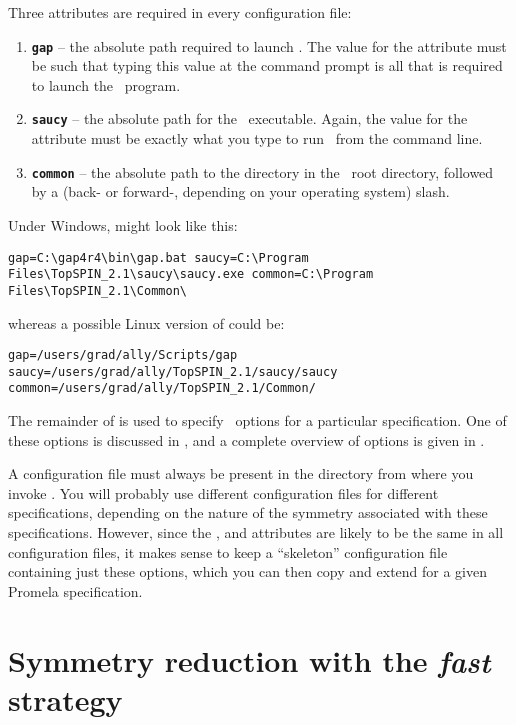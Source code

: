 \noindent Three attributes are required in every configuration file:

\vspace{2mm}
\begin{enumerate}
\item {\bf \texttt{gap}} -- the absolute path required to launch \gap.  The value for
the  attribute must be such that typing this value at
the command prompt is all that is required to launch the \gap\
program.
\item {\bf \texttt{saucy}}  -- the absolute path for the \saucy\ executable.  Again, the
value for the \inline{saucy} attribute must be exactly what you type
to run \saucy\ from the command line.
\item {\bf \texttt{common}} -- the absolute path to the  directory in
the \topspin\ root directory, followed by a (back- or forward-,
depending on your operating system) slash.
\end{enumerate}
%
Under Windows,  might look like this:
%
\begin{lstlisting}
gap=C:\gap4r4\bin\gap.bat saucy=C:\Program
Files\TopSPIN_2.1\saucy\saucy.exe common=C:\Program
Files\TopSPIN_2.1\Common\
\end{lstlisting}
%
whereas a possible Linux version of  could be:
%
\begin{lstlisting}
gap=/users/grad/ally/Scripts/gap
saucy=/users/grad/ally/TopSPIN_2.1/saucy/saucy
common=/users/grad/ally/TopSPIN_2.1/Common/
\end{lstlisting}
%
The remainder of  is used to specify \topspin\
options for a particular specification.  One of these options is
discussed in , and a complete overview of
options is given in \chapref{overview}.

A configuration file must always be present in the directory from
where you invoke \topspin.  You will probably use different
configuration files for different specifications, depending on the
nature of the symmetry associated with these specifications.
However, since the \inline{gap}, \inline{saucy} and 
attributes are likely to be the same in all configuration files, it
makes sense to keep a ``skeleton'' configuration file containing
just these options, which you can then copy and extend for a given
Promela specification.

\section{Symmetry reduction with the \emph{fast} strategy}\label{sec:example:fast}

